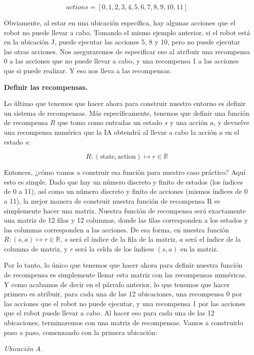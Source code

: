 \documentclass[
]{book}
\begin{document}
\[actions = [0,1,2,3,4,5,6,7,8,9,10,11]\]

Obviamente, al estar en una ubicación específica, hay algunas acciones que el robot no puede llevar a cabo. Tomando el mismo ejemplo anterior, si el robot está en la ubicación J, puede ejecutar las acciones 5, 8 y 10, pero no puede ejecutar las otras acciones. Nos aseguraremos de especificar eso al atribuir una recompensa 0 a las acciones que no puede llevar a cabo, y una recompensa 1 a las acciones que si puede realizar. Y eso nos lleva a las recompensas.

\textbf{Definir las recompensas.}

Lo último que tenemos que hacer ahora para construir nuestro entorno es definir un sistema de recompensas. Más específicamente, tenemos que definir una función de recompensa \(R\) que toma como entradas un estado \(s\) y una acción \(a\), y devuelve una recompensa numérica que la IA obtendrá al llevar a cabo la acción \(a\) en el estado \(s\):

\[R : (\textrm{state}, \textrm{action}) \mapsto r \in \mathbb{R}\]

Entonces, ¿cómo vamos a construir esa función para nuestro caso práctico? Aquí esto es simple. Dado que hay un número discreto y finito de estados (los índices de 0 a 11), así como un número discreto y finito de acciones (mismos índices de 0 a 11), la mejor manera de construir nuestra función de recompensa R es simplemente hacer una matriz. Nuestra función de recompensa será exactamente una matriz de 12 filas y 12 columnas, donde las filas corresponden a los estados y las columnas corresponden a las acciones. De esa forma, en nuestra función \(R: (s, a) \mapsto r \in \mathbb{R}\), \(s\) será el índice de la fila de la matriz, \(a\) será el índice de la columna de matriz, y \(r\) será la celda de los índices \((s, a)\) en la matriz.

Por lo tanto, lo único que tenemos que hacer ahora para definir nuestra función de recompensa es simplemente llenar esta matriz con las recompensas numéricas. Y como acabamos de decir en el párrafo anterior, lo que tenemos que hacer primero es atribuir, para cada una de las 12 ubicaciones, una recompensa 0 por las acciones que el robot no puede ejecutar, y una recompensa 1 por las acciones que el robot puede llevar a cabo. Al hacer eso para cada una de las 12 ubicaciones, terminaremos con una matriz de recompensas. Vamos a construirlo paso a paso, comenzando con la primera ubicación:

\emph{Ubicación A.}
\end{document}
